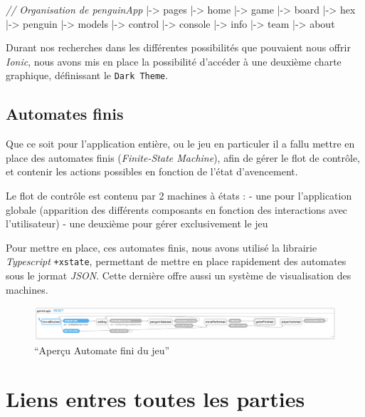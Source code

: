 \documentclass[a4paper,11pt]{article}
\newenvironment{Shaded}{}{}
\newcommand{\CommentTok}[1]{\textit{#1}}
\newcommand{\NormalTok}[1]{#1}
\begin{document}
\begin{Shaded}
\begin{Highlighting}[numbers=left,,firstnumber=0,]
\CommentTok{// Organisation de penguinApp}
\NormalTok{|-> pages}
\NormalTok{    |-> home}
\NormalTok{    |-> game}
\NormalTok{        |-> board}
\NormalTok{            |-> hex}
\NormalTok{            |-> penguin}
\NormalTok{            |-> models}
\NormalTok{        |-> control}
\NormalTok{        |-> console}
\NormalTok{        |-> info}
\NormalTok{     |-> team}
\NormalTok{     |-> about}
\end{Highlighting}
\end{Shaded}

Durant nos recherches dans les différentes possibilités que pouvaient
nous offrir \emph{Ionic}, nous avons mis en place la possibilité
d'accéder à une deuxième charte graphique, définissant le
\texttt{Dark\ Theme}.

\subsection{Automates finis}\label{automates-finis}

Que ce soit pour l'application entière, ou le jeu en particuler il a
fallu mettre en place des automates finis (\emph{Finite-State Machine}),
afin de gérer le flot de contrôle, et contenir les actions possibles en
fonction de l'état d'avencement.

Le flot de contrôle est contenu par 2 machines à états : - une pour
l'application globale (apparition des différents composants en fonction
des interactions avec l'utilisateur) - une deuxième pour gérer
exclusivement le jeu

Pour mettre en place, ces automates finis, nous avons utilisé la
librairie \emph{Typescript} \texttt{+xstate}, permettant de mettre en
place rapidement des automates sous le jormat \emph{JSON}. Cette
dernière offre aussi un système de visualisation des machines.

\begin{figure}
\centering
\includegraphics{gameMachine.png}
\caption{``Aperçu Automate fini du jeu''}
\end{figure}

\section{Liens entres toutes les
parties}\label{liens-entres-toutes-les-parties}
\end{document}
